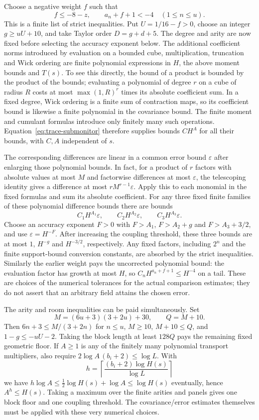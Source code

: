 Choose a negative weight $f$ such that
\[
 f\le-8-z,\qquad a_n+f+1<-4\quad(1\le n\le u).
\]
This is a finite list of strict inequalities. Put $U=1/16-f>0$,
choose an integer $g\ge uU+10$, and take Taylor order
$D=g+d+5$. The degree and arity are now fixed before selecting the
accuracy exponent below. The additional coefficient norms introduced
by evaluation on a bounded cube, multiplication, truncation and Wick
ordering are finite polynomial expressions in $H$, the above moment
bounds and $T(s)$. To see this directly, the bound of a product is
bounded by the product of the bounds; evaluating a polynomial of
degree $r$ on a cube of radius $R$ costs at most
$\max(1,R)^r$ times its absolute coefficient sum. In a fixed degree,
Wick ordering is a finite sum of contraction maps, so its coefficient
bound is likewise a finite polynomial in the covariance bound. The
finite moment and cumulant formulas introduce only finitely many such
operations. Equation~\eqref{eq:trace-submonitor} therefore supplies
bounds $C H^A$ for all their bounds, with $C,A$ independent of $s$.

The corresponding differences are linear in a common error bound
$\varepsilon$ after enlarging those polynomial bounds. In fact,
for a product of $r$ factors with absolute values at most $M$ and
factorwise differences at most $\varepsilon$, the telescoping identity
gives a difference at most $rM^{r-1}\varepsilon$. Apply this to each
monomial in the fixed formulas and sum its absolute coefficient.
For any three fixed finite families of these polynomial difference
bounds there are bounds
\[
 C_1H^{A_1}\varepsilon,\qquad
 C_2H^{A_2}\varepsilon,\qquad C_3H^{A_3}\varepsilon.
\]
Choose an accuracy exponent $F>0$ with
$F>A_1$, $F>A_2+g$ and $F>A_3+3/2$, and use
$\varepsilon=H^{-F}$. After increasing the coupling threshold, these
three bounds are at most $1$, $H^{-g}$ and $H^{-3/2}$,
respectively. Any fixed factors, including $2^n$ and the finite
support-bound conversion constants, are absorbed by the strict
inequalities. Similarly the earlier weight pays the uncorrected
polynomial bound: the evaluation factor has growth at most $H$, so
$C_nH^{a_n+f+1}\le H^{-4}$ on a tail. These are choices of
the numerical tolerances for the actual comparison estimates; they do
not assert that an arbitrary field attains the chosen error.

The arity and room inequalities can be paid simultaneously. Set
\[
 M=(6u+3)(3+2u)+30,\qquad Q=M+10.
\]
Then $6n+3\le M/(3+2n)$ for $n\le u$, $M\ge10$,
$M+10\le Q$, and $1-g\le-uU-2$. Taking the block length
at least $128Q$ pays the remaining fixed geometric floor. If
$A\ge1$ is any of the finitely many polynomial transport multipliers,
also require $2\log A\,(b_i+2)\le\log L$. With
\[
 h=\left\lceil\frac{(b_i+2)\log H(s)}{\log L}\right\rceil
\]
we have $h\log A\le\tfrac12\log H(s)+\log A\le\log H(s)$
eventually, hence $A^h\le H(s)$. Taking a maximum over the finite
arities and panels gives one block floor and one coupling threshold.
The covariance/error estimates themselves must be applied with these
very numerical choices.

